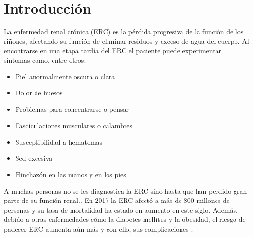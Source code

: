 \documentclass{Academic}
\begin{document}
\myabstract{}
\renewcommand{\myTitle}{Uso de Redes Bayesianas Gaussianas para comprender 
el efecto de biomarcadores en la Enfermedad renal crónica: Un análisis probabilístico}
\renewcommand{\MyAuthors}{%
    Jessica Milagros Cordero Rivera$^{1}$ \quad
    Diego Rodrigo González Ramírez$^{1}$\\[0.2em]
    Jose Ángel Lechuga Carrasco$^{1}$ \quad
    Julio Lizárraga Beltrán$^{1}$
}

\renewcommand{\MyAffiliations}{%
    $^{1}$Escuela de Ingeniería y Ciencias
}

\renewcommand{\AuthorIDs}{%
    A01647083 \;|\; A01647198 \;|\; A00228198 \;|\; A01743628
}

\renewcommand{\ShortAuthors}{Cordero Rivera et al.}

\renewcommand{\Keywords}{enfermedad crónica renal, red bayesiana, red bayesiana gaussiana, keyword4, keyword5}
\maketitle
\onehalfspacing

\section{Introducción}


La enfermedad renal crónica (ERC) es la pérdida progresiva de la función de los riñones, 
afectando su función de eliminar residuos y exceso de agua del cuerpo. Al encontrarse
en una etapa tardía del ERC el paciente puede experimentar síntomas como, entre otros:

\begin{itemize}
  \item Piel anormalmente oscura o clara
  \item Dolor de huesos
  \item Problemas para concentrarse o pensar
  \item Fasciculaciones musculares o calambres
  \item Susceptibilidad a hematomas
  \item Sed excesiva
  \item Hinchazón en las manos y en los pies
\end{itemize}

A muchas personas no se les diagnostica la ERC sino hasta que han perdido 
gran parte de su función renal.\cite{definicion}. 
En 2017 la ERC afectó a más de 800 millones de personas y su tasa de mortalidad ha 
estado en aumento en este siglo. Además, debido a otras enfermedades cómo la diabetes mellitus 
y la obesidad, el riesgo de padecer ERC aumenta aún más y con ello, sus complicaciones \cite{Csaba}.
\end{document}

